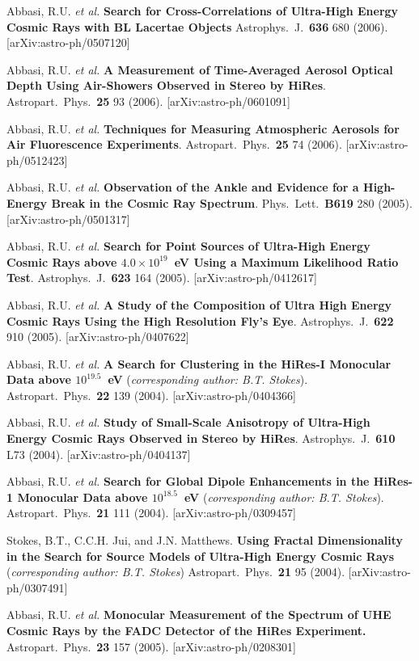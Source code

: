 \begin{resume}
Abbasi, R.U. {\it et al.}  {\bf Search for Cross-Correlations of Ultra-High
Energy Cosmic Rays with BL Lacertae Objects} Astrophys.\ J.\ {\bf 636} 680
(2006).
[arXiv:astro-ph/0507120]

Abbasi, R.U. {\it et al.}  {\bf A Measurement of Time-Averaged Aerosol Optical
Depth Using Air-Showers Observed in Stereo by HiRes}. Astropart.\ Phys.\
{\bf 25} 93 (2006).
[arXiv:astro-ph/0601091]

Abbasi, R.U. {\it et al.}  {\bf Techniques for Measuring Atmospheric Aerosols
for Air Fluorescence Experiments}. Astropart.\ Phys.\ {\bf 25} 74 (2006).
[arXiv:astro-ph/0512423]

Abbasi, R.U. {\it et al.}  {\bf Observation of the Ankle and Evidence for a
High-Energy Break in the Cosmic Ray Spectrum}. Phys.\ Lett.\ {\bf B619} 280
(2005). [arXiv:astro-ph/0501317]

Abbasi, R.U. {\it et al.}  {\bf Search for Point Sources of Ultra-High Energy
Cosmic Rays above \boldmath$4.0\times 10^{19}$~eV Using a Maximum Likelihood
Ratio Test}. Astrophys.\ J.\ {\bf 623} 164 (2005).
[arXiv:astro-ph/0412617]

Abbasi, R.U. {\it et al.}  {\bf A Study of the Composition of Ultra High
Energy Cosmic Rays Using the High Resolution Fly's Eye}.  Astrophys.\ J.\
{\bf 622} 910 (2005).
[arXiv:astro-ph/0407622]

Abbasi, R.U. {\it et al.}  {\bf A Search for Clustering in the HiRes-I
Monocular Data above \boldmath$10^{19.5}$~eV}
({\it corresponding author: B.T. Stokes}).
Astropart.\ Phys.\ {\bf 22} 139 (2004).
[arXiv:astro-ph/0404366]

Abbasi, R.U. {\it et al.}  {\bf Study of Small-Scale Anisotropy of Ultra-High
Energy Cosmic Rays Observed in Stereo by HiRes}. Astrophys.\ J.\ {\bf 610} L73
(2004).
[arXiv:astro-ph/0404137]

Abbasi, R.U. {\it et al.}  { \bf Search for Global Dipole Enhancements in the
HiRes-1 Monocular Data above \boldmath$10^{18.5}$~eV }
({\it corresponding author: B.T. Stokes}).
Astropart.\ Phys.\ {\bf 21} 111 (2004).
[arXiv:astro-ph/0309457]

Stokes, B.T., C.C.H. Jui, and J.N. Matthews.  {\bf Using Fractal
Dimensionality in
the Search for Source Models of Ultra-High Energy Cosmic Rays}
({\it corresponding author: B.T. Stokes})
Astropart.\ Phys.\ {\bf 21} 95 (2004).
[arXiv:astro-ph/0307491]

Abbasi, R.U. {\it et al.}  {\bf  Monocular Measurement of the Spectrum of
UHE Cosmic Rays by the FADC Detector of the HiRes Experiment.}
Astropart.\ Phys.\ {\bf 23} 157 (2005).
[arXiv:astro-ph/0208301]


\end{resume}
